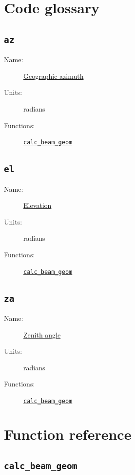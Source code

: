 \documentclass{book}
\begin{document}
\section{Code glossary}

\subsection{\texttt{az}}
\begin{description}
    \item[Name:] \hyperlink{sec:coordslocalsky}{Geographic azimuth}
    \item[Units:] radians
    \item[Functions:] \hyperlink{cn:calc_beam_geom}{\texttt{calc\_beam\_geom}}
\end{description}

\subsection{\texttt{el}}
\begin{description}
    \item[Name:] \hyperlink{sec:coordslocalsky}{Elevation}
    \item[Units:] radians
    \item[Functions:] \hyperlink{cn:calc_beam_geom}{\texttt{calc\_beam\_geom}}
\end{description}

\subsection{\texttt{za}}
\begin{description}
    \item[Name:] \hyperlink{sec:coordslocalsky}{Zenith angle}
    \item[Units:] radians
    \item[Functions:] \hyperlink{cn:calc_beam_geom}{\texttt{calc\_beam\_geom}}
\end{description}

\section{Function reference}

\subsection{\texttt{calc\_beam\_geom}}
\label{fcn:calc_beam_geom}

\printindex
\end{document}
